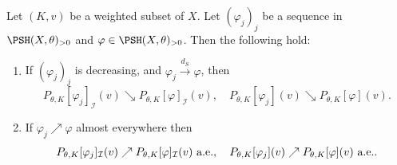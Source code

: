 \begin{proposition}\label{prop:conv_of_K_env}
    Let $(K,v)$ be a weighted subset of $X$. Let $(\varphi_j)_j$ be a sequence in $\PSH(X,\theta)_{>0}$ and $\varphi\in \PSH(X,\theta)_{>0}$. Then the following hold:
\begin{enumerate}
    \item\label{itm:prop:conv_of_K_env:1} If $(\varphi_j)_j$ is decreasing, and $\varphi_j\xrightarrow{d_S}\varphi$, then
    \begin{equation}\label{eq:PthetaKvarphij1}
    P_{\theta,K}[\varphi_j]_{\mathcal{I}}(v) \searrow P_{\theta,K}[\varphi]_{\mathcal{I}}(v),\quad P_{\theta,K}[\varphi_j](v) \searrow P_{\theta,K}[\varphi](v).
    \end{equation}
    \item\label{itm:prop:conv_of_K_env:2} If $\varphi_j \nearrow \varphi$ almost everywhere then
    \[
    P_{\theta,K}[\varphi_j]_{\mathcal{I}}(v) \nearrow P_{\theta,K}[\varphi]_{\mathcal{I}}(v)\textup{ a.e.},\quad P_{\theta,K}[\varphi_j](v) \nearrow P_{\theta,K}[\varphi](v) \textup{ a.e.}.
    \]
\end{enumerate}
\end{proposition}

